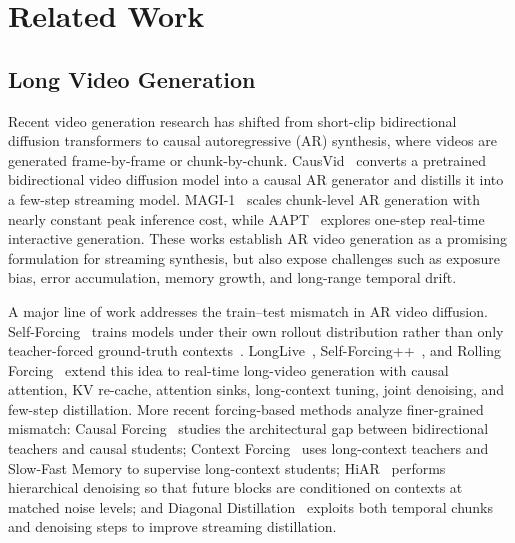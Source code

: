 \documentclass{llmxive}
\begin{document}
{
  
  
}



\appendix
\section{Related Work}
\subsection{Long Video Generation}
Recent video generation research has shifted from short-clip bidirectional diffusion transformers to causal autoregressive (AR) synthesis, where videos are generated frame-by-frame or chunk-by-chunk.
CausVid~\cite{yin2024slow} converts a pretrained bidirectional video diffusion model into a causal AR generator and distills it into a few-step streaming model.
MAGI-1~\cite{sandai2025magi1} scales chunk-level AR generation with nearly constant peak inference cost, while AAPT~\cite{lin2025aapt} explores one-step real-time interactive generation.
These works establish AR video generation as a promising formulation for streaming synthesis, but also expose challenges such as exposure bias, error accumulation, memory growth, and long-range temporal drift.

A major line of work addresses the train--test mismatch in AR video diffusion.
Self-Forcing~\cite{huang2025self} trains models under their own rollout distribution rather than only teacher-forced ground-truth contexts~\cite{zhou2025taming, acdit}.
LongLive~\cite{yang2025longlive}, Self-Forcing++~\cite{cui2025selfforcingminutescalehighqualityvideo}, and Rolling Forcing~\cite{liu2025rolling} extend this idea to real-time long-video generation with causal attention, KV re-cache, attention sinks, long-context tuning, joint denoising, and few-step distillation.
More recent forcing-based methods analyze finer-grained mismatch: Causal Forcing~\cite{zhu2026causal} studies the architectural gap between bidirectional teachers and causal students; Context Forcing~\cite{chen2026context} uses long-context teachers and Slow-Fast Memory to supervise long-context students; HiAR~\cite{zou2026hiar} performs hierarchical denoising so that future blocks are conditioned on contexts at matched noise levels; and Diagonal Distillation~\cite{liu2026diagonal} exploits both temporal chunks and denoising steps to improve streaming distillation.
\end{document}
